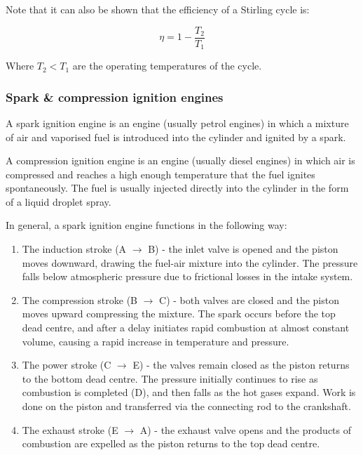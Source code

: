 \documentclass{article}
\begin{document}
Note that it can also be shown that the efficiency of a Stirling cycle is:

\[ \eta = 1 - \frac{T_2}{T_1} \]

Where $T_2 < T_1$ are the operating temperatures of the cycle.

\subsubsection{Spark \& compression ignition engines}

\begin{definition}
    A spark ignition engine is an engine (usually petrol engines) in which a mixture of air and vaporised fuel is introduced into the cylinder and ignited by a spark.
\end{definition}

\begin{definition}
    A compression ignition engine is an engine (usually diesel engines) in which air is compressed and reaches a high enough temperature that the fuel ignites spontaneously. The fuel is usually injected directly into the cylinder in the form of a liquid droplet spray.
\end{definition}

In general, a spark ignition engine functions in the following way:

\begin{enumerate}
    \item The induction stroke (A $\to$ B) - the inlet valve is opened and the piston moves downward, drawing the fuel-air mixture into the cylinder. The pressure falls below atmospheric pressure due to frictional losses in the intake system.
    \item The compression stroke (B $\to$ C) - both valves are closed and the piston moves upward compressing the mixture. The spark occurs before the top dead centre, and after a delay initiates rapid combustion at almost constant volume, causing a rapid increase in temperature and pressure.
    \item The power stroke (C $\to$ E) - the valves remain closed as the piston returns to the bottom dead centre. The pressure initially continues to rise as combustion is completed (D), and then falls as the hot gases expand. Work is done on the piston and transferred via the connecting rod to the crankshaft.
    \item The exhaust stroke (E $\to$ A) - the exhaust valve opens and the products of combustion are expelled as the piston returns to the top dead centre.
\end{enumerate}
\end{document}

